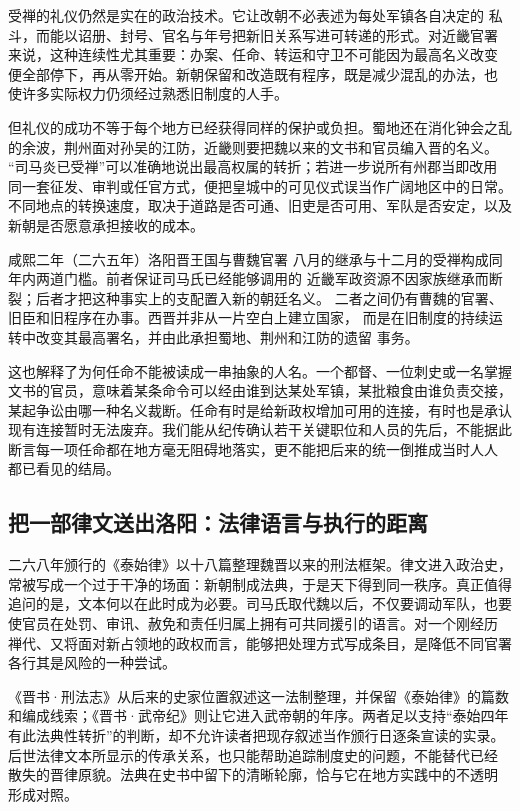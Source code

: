 受禅的礼仪仍然是实在的政治技术。它让改朝不必表述为每处军镇各自决定的
私斗，而能以诏册、封号、官名与年号把新旧关系写进可转递的形式。对近畿官署
来说，这种连续性尤其重要：办案、任命、转运和守卫不可能因为最高名义改变
便全部停下，再从零开始。新朝保留和改造既有程序，既是减少混乱的办法，也
使许多实际权力仍须经过熟悉旧制度的人手。

但礼仪的成功不等于每个地方已经获得同样的保护或负担。蜀地还在消化钟会之乱
的余波，荆州面对孙吴的江防，近畿则要把魏以来的文书和官员编入晋的名义。
“司马炎已受禅”可以准确地说出最高权属的转折；若进一步说所有州郡当即改用
同一套征发、审判或任官方式，便把皇城中的可见仪式误当作广阔地区中的日常。
不同地点的转换速度，取决于道路是否可通、旧吏是否可用、军队是否安定，以及
新朝是否愿意承担接收的成本。

\begin{event}{}{咸熙二年（二六五年）}{洛阳}{晋王国与曹魏官署}
八月的继承与十二月的受禅构成同年内两道门槛。前者保证司马氏已经能够调用的
近畿军政资源不因家族继承而断裂；后者才把这种事实上的支配置入新的朝廷名义。
二者之间仍有曹魏的官署、旧臣和旧程序在办事。西晋并非从一片空白上建立国家，
而是在旧制度的持续运转中改变其最高署名，并由此承担蜀地、荆州和江防的遗留
事务。
\end{event}

这也解释了为何任命不能被读成一串抽象的人名。一个都督、一位刺史或一名掌握
文书的官员，意味着某条命令可以经由谁到达某处军镇，某批粮食由谁负责交接，
某起争讼由哪一种名义裁断。任命有时是给新政权增加可用的连接，有时也是承认
现有连接暂时无法废弃。我们能从纪传确认若干关键职位和人员的先后，不能据此
断言每一项任命都在地方毫无阻碍地落实，更不能把后来的统一倒推成当时人人
都已看见的结局。

\subsection{把一部律文送出洛阳：法律语言与执行的距离}

二六八年颁行的《泰始律》以十八篇整理魏晋以来的刑法框架。律文进入政治史，
常被写成一个过于干净的场面：新朝制成法典，于是天下得到同一秩序。真正值得
追问的是，文本何以在此时成为必要。司马氏取代魏以后，不仅要调动军队，也要
使官员在处罚、审讯、赦免和责任归属上拥有可共同援引的语言。对一个刚经历
禅代、又将面对新占领地的政权而言，能够把处理方式写成条目，是降低不同官署
各行其是风险的一种尝试。

《晋书·刑法志》从后来的史家位置叙述这一法制整理，并保留《泰始律》的篇数
和编成线索；《晋书·武帝纪》则让它进入武帝朝的年序。两者足以支持“泰始四年
有此法典性转折”的判断，却不允许读者把现存叙述当作颁行日逐条宣读的实录。
后世法律文本所显示的传承关系，也只能帮助追踪制度史的问题，不能替代已经
散失的晋律原貌。法典在史书中留下的清晰轮廓，恰与它在地方实践中的不透明
形成对照。

